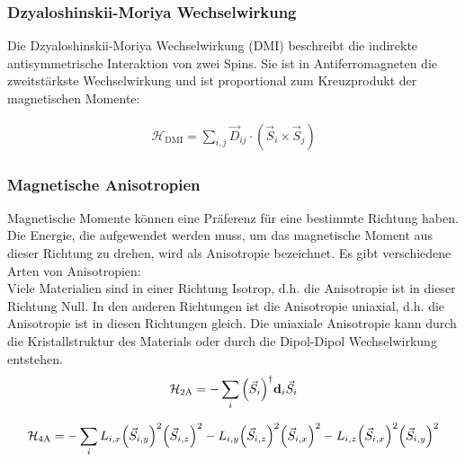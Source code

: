 \documentclass[main.tex]{subfiles}
\begin{document}
\subsubsection*{Dzyaloshinskii-Moriya Wechselwirkung}

Die Dzyaloshinskii-Moriya Wechselwirkung (DMI) beschreibt die indirekte
antisymmetrische Interaktion von zwei Spins\cite{DMI}. Sie ist in
Antiferromagneten die zweitstärkste Wechselwirkung und ist proportional zum
Kreuzprodukt der magnetischen Momente:

\begin{align}
	\mathcal{H}_{\text{DMI}} = \sum_{i,j} \vec{D}_{ij} \cdot (\vec{S}_i
	\times
	\vec{S}_j)\label{eq:hamilton-dmi}
\end{align}

\subsubsection*{Magnetische Anisotropien}
Magnetische Momente können eine Präferenz für eine bestimmte Richtung haben.
Die Energie, die aufgewendet werden muss, um das magnetische Moment aus dieser
Richtung zu drehen, wird als Anisotropie bezeichnet. Es gibt verschiedene Arten
von Anisotropien:\\

Viele Materialien sind in einer Richtung Isotrop, d.h. die Anisotropie ist in
dieser Richtung Null. In den anderen Richtungen ist die Anisotropie uniaxial,
d.h. die Anisotropie ist in diesen Richtungen gleich. Die uniaxiale Anisotropie
kann durch die Kristallstruktur des Materials oder durch die Dipol-Dipol
Wechselwirkung entstehen.\\

\begin{align}
	\mathcal{H}_{\text{2A}} = -\sum_{i} \qty(\vec{S}_i)^\dagger
	\mathbf{d}_i
	\vec{S}_i\label{eq:hamilton-2a}
\end{align}

\begin{align}
	\mathcal{H}_{\text{4A}} = -\sum_{i} L_{i,x} \qty(\vec{S}_{i,y})^2
	\qty(\vec{S}_{i,z})^2 - L_{i,y} \qty(\vec{S}_{i,z})^2
	\qty(\vec{S}_{i,x})^2
	-
	L_{i,z} \qty(\vec{S}_{i,x})^2 \qty(\vec{S}_{i,y})^2\label{eq:hamilton-4a}
\end{align}\cite{GrossMarx}
\end{document}
